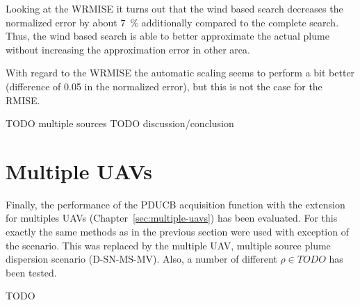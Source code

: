 Looking at the WRMISE it turns out that the wind based search decreases the 
normalized error by about \SI{7}{\percent} additionally compared to the complete 
search. Thus, the wind based search is able to better approximate the actual 
plume without increasing the approximation error in other area.

With regard to the WRMISE the automatic scaling seems to perform a bit better 
(difference of \num{0.05} in the normalized error), but this is not the case for 
the RMISE\@.

TODO multiple sources
TODO discussion/conclusion

\section{Multiple UAVs}
Finally, the performance of the PDUCB acquisition function with the extension 
for multiples UAVs (Chapter~\ref{sec:multiple-uavs}) has been evaluated. For 
this exactly the same methods as in the previous section were used with 
exception of the scenario. This was replaced by the multiple UAV, multiple 
source plume dispersion scenario (D-SN-MS-MV). Also, a number of different $\rho 
\in TODO$ has been tested.

TODO
